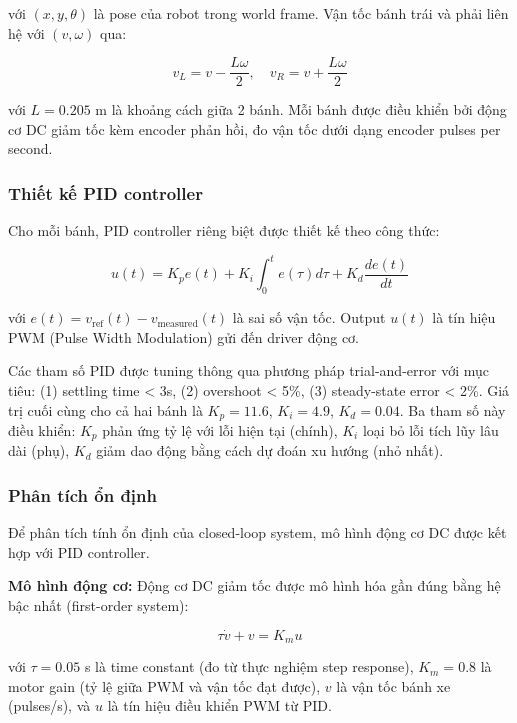 với $(x, y, \theta)$ là pose của robot trong world frame. Vận tốc bánh trái và phải liên hệ với $(v, \omega)$ qua:

\begin{equation}
v_L = v - \frac{L\omega}{2}, \quad v_R = v + \frac{L\omega}{2}
\label{eq:wheel_velocity}
\end{equation}

với $L = 0.205$ m là khoảng cách giữa 2 bánh. Mỗi bánh được điều khiển bởi động cơ DC giảm tốc kèm encoder phản hồi, đo vận tốc dưới dạng encoder pulses per second.

\subsubsection{Thiết kế PID controller}

Cho mỗi bánh, PID controller riêng biệt được thiết kế theo công thức:

\begin{equation}
u(t) = K_p e(t) + K_i \int_0^t e(\tau) d\tau + K_d \frac{de(t)}{dt}
\label{eq:pid}
\end{equation}

với $e(t) = v_{\text{ref}}(t) - v_{\text{measured}}(t)$ là sai số vận tốc. Output $u(t)$ là tín hiệu PWM (Pulse Width Modulation) gửi đến driver động cơ.

Các tham số PID được tuning thông qua phương pháp trial-and-error với mục tiêu: (1) settling time < 3s, (2) overshoot < 5\%, (3) steady-state error < 2\%. Giá trị cuối cùng cho cả hai bánh là $K_p = 11.6$, $K_i = 4.9$, $K_d = 0.04$. Ba tham số này điều khiển: $K_p$ phản ứng tỷ lệ với lỗi hiện tại (chính), $K_i$ loại bỏ lỗi tích lũy lâu dài (phụ), $K_d$ giảm dao động bằng cách dự đoán xu hướng (nhỏ nhất).

\subsubsection{Phân tích ổn định}

Để phân tích tính ổn định của closed-loop system, mô hình động cơ DC được kết hợp với PID controller.

\textbf{Mô hình động cơ:} Động cơ DC giảm tốc được mô hình hóa gần đúng bằng hệ bậc nhất (first-order system):

\begin{equation}
\tau \dot{v} + v = K_m u
\label{eq:motor_model}
\end{equation}

với $\tau = 0.05$ s là time constant (đo từ thực nghiệm step response), $K_m = 0.8$ là motor gain (tỷ lệ giữa PWM và vận tốc đạt được), $v$ là vận tốc bánh xe (pulses/s), và $u$ là tín hiệu điều khiển PWM từ PID.

